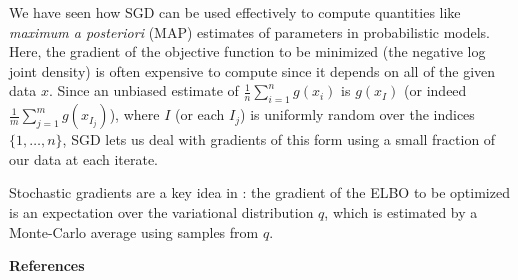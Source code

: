 \documentclass[12pt]{article}
\begin{document}
We have seen how SGD can be used effectively to compute quantities like
\emph{maximum a posteriori} (MAP) estimates of parameters in probabilistic
models.
Here, the gradient of the objective function to be minimized (the negative log
joint density) is often expensive to compute since it depends on all of the
given data $x$.
Since an unbiased estimate of $\frac{1}{n}\sum_{i = 1}^n g(x_i)$ is $g(x_I)$
(or indeed $\frac{1}{m}\sum_{j = 1}^m g(x_{I_j})$), where $I$ (or each $I_j$)
is uniformly random over the indices $\{1, \dots, n\}$, SGD lets us deal with
gradients of this form using a small fraction of our data at each iterate.

Stochastic gradients are a key idea in \cite{ranganath14}: the gradient of the
ELBO to be optimized is an expectation over the variational distribution $q$,
which is estimated by a Monte-Carlo average using samples from $q$.


\nocite{*}


\vfill

\begingroup
\renewcommand{\section}[2]{}%
\textbf{References}

\endgroup
\end{document}
